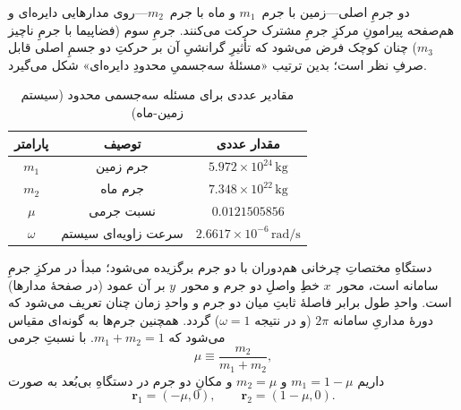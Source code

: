 دو جرمِ اصلی—زمین
با جرم~$m_{1}$ و ماه با جرم~$m_{2}$—روی مدارهایی دایره‌ای و هم‌صفحه پیرامونِ مرکزِ جرمِ مشترک حرکت می‌کنند. جرمِ سوم (فضاپیما با جرمِ ناچیز $m_{3}$) چنان کوچک فرض می‌شود که تأثیرِ گرانشیِ آن بر حرکتِ دو جسمِ اصلی قابل صرفِ نظر است؛ بدین ترتیب «مسئلهٔ سه‌جسمیِ محدودِ دایره‌ای» شکل می‌گیرد.



\begin{table}[H]
	\centering
	\caption{مقادیر عددی برای مسئله سه‌جسمی محدود (سیستم زمین-ماه)}
	\begin{tabular}{|c|c|c|}
		\hline
		پارامتر & توصیف & مقدار عددی \\
		\hline
		$m_1$ & جرم زمین & $5.972 \times 10^{24}\,\mathrm{kg}$ \\
		$m_2$ & جرم ماه & $7.348 \times 10^{22}\,\mathrm{kg}$ \\
		$\mu$ & نسبت جرمی & $0.0121505856$ \\
		$\omega$ & سرعت زاویه‌ای سیستم & $2.6617 \times 10^{-6}\,\mathrm{rad/s}$ \\
		\hline
	\end{tabular}
	\label{tab:params}
\end{table}



دستگاهِ مختصاتِ چرخانی هم‌دوران با دو جرم برگزیده می‌شود؛ مبدأ در مرکزِ جرمِ سامانه است، محور~$x$ خطِ واصلِ دو جرم و محور~$y$ بر آن عمود (در صفحهٔ مدارها) است. واحدِ طول برابر فاصلهٔ ثابتِ میان دو جرم و واحدِ زمان چنان تعریف می‌شود که دورهٔ مداریِ سامانه $2\pi$ (و در نتیجه $\omega=1$) گردد. همچنین جرم‌ها به گونه‌ای مقیاس می‌شود که $m_{1}+m_{2}=1$. با نسبتِ جرمی
\begin{equation}
	\mu\equiv\frac{m_{2}}{m_{1}+m_{2}},
\end{equation}
داریم $m_{1}=1-\mu$ و $m_{2}=\mu$ و مکانِ دو جرم در دستگاهِ بی‌بُعد به صورت
\begin{equation}
	\mathbf r_{1}=(-\mu,0),\qquad \mathbf r_{2}=(1-\mu,0).
\end{equation}


